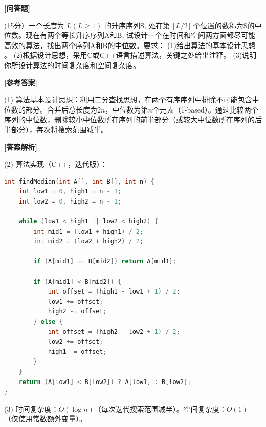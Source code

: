 \documentclass[12pt,a4paper]{article}
\newenvironment{choicequestion}[1][]{%
    \vspace{0.5cm}
    \noindent\textbf{[#1]}
    \vspace{0.2cm}
}{}
\newenvironment{answersection}{%
    \vspace{0.2cm}
    \noindent\textbf{[参考答案]}\\
    \vspace{0.1cm}
}{}
\newenvironment{analysissection}{%
    \vspace{0.2cm}
    \noindent\textbf{[答案解析]}\\
    \vspace{0.1cm}
}{}
\newcounter{questioncounter}
\newcounter{questioncounter}
\newcommand{\question}[2]{%
    \stepcounter{questioncounter}%
    \noindent\textbf{\thequestioncounter} #1%
}
\begin{document}
\begin{choicequestion}[问答题]
\question{(15分）一个长度为 $L ( L \geq 1 )$ 的升序序列S, 处在第 $\lfloor L / 2 \rfloor$ 个位置的数称为S的中位数。现在有两个等长升序序列A和B, 试设计一个在时间和空间两方面都尽可能高效的算法，找出两个序列A和B的中位数。要求：\newline
(1)给出算法的基本设计思想 。  \newline
(2)根据设计思想，采用C或C++语言描述算法，关键之处给出注释。  \newline
(3)说明你所设计算法的时间复杂度和空间复杂度。}{}

\begin{answersection}
(1) 算法基本设计思想：利用二分查找思想，在两个有序序列中排除不可能包含中位数的部分。合并后总长度为$2n$，中位数为第$n$个元素（1-based）。通过比较两个序列的中位数，删除较小中位数所在序列的前半部分（或较大中位数所在序列的后半部分），每次将搜索范围减半。
\end{answersection}

\begin{analysissection}
(2) 算法实现（C++，迭代版）：
\begin{lstlisting}[language=C]
int findMedian(int A[], int B[], int n) {
    int low1 = 0, high1 = n - 1;
    int low2 = 0, high2 = n - 1;
    
    while (low1 < high1 || low2 < high2) {
        int mid1 = (low1 + high1) / 2;
        int mid2 = (low2 + high2) / 2;
        
        if (A[mid1] == B[mid2]) return A[mid1];
        
        if (A[mid1] < B[mid2]) {
            int offset = (high1 - low1 + 1) / 2;
            low1 += offset;
            high2 -= offset;
        } else {
            int offset = (high2 - low2 + 1) / 2;
            low2 += offset;
            high1 -= offset;
        }
    }
    return (A[low1] < B[low2]) ? A[low1] : B[low2];
}
\end{lstlisting}

(3) 时间复杂度：$O(\log n)$（每次迭代搜索范围减半）。空间复杂度：$O(1)$（仅使用常数额外变量）。
\end{analysissection}
\end{choicequestion}
\end{document}
